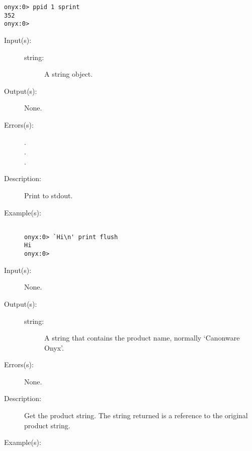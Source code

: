 \begin{description}
\begin{description}
\begin{verbatim}
onyx:0> ppid 1 sprint
352
onyx:0>
		\end{verbatim}
	\end{description}
\label{systemdict:print}
\item[{\onyxop{string}{print}{--}}: ]
	\begin{description}\item[]
	\item[Input(s): ]
		\begin{description}\item[]
		\item[string: ]
			A string object.
		\end{description}
	\item[Output(s): ] None.
	\item[Errors(s): ]
		\begin{description}\item[]
		\item[.]
		\item[.]
		\item[.]
		\end{description}
	\item[Description: ]
		Print  to stdout.
	\item[Example(s): ]\begin{verbatim}

onyx:0> `Hi\n' print flush
Hi
onyx:0>
		\end{verbatim}
	\end{description}
\label{systemdict:product}
\item[{\onyxop{--}{product}{string}}: ]
	\begin{description}\item[]
	\item[Input(s): ] None.
	\item[Output(s): ]
		\begin{description}\item[]
		\item[string: ]
			A string that contains the product name, normally
			`Canonware Onyx'.
		\end{description}
	\item[Errors(s): ] None.
	\item[Description: ]
		Get the product string.  The string returned is a reference to
		the original product string.
	\item[Example(s): ]\begin{verbatim}


\end{verbatim}
\end{description}
\end{description}
